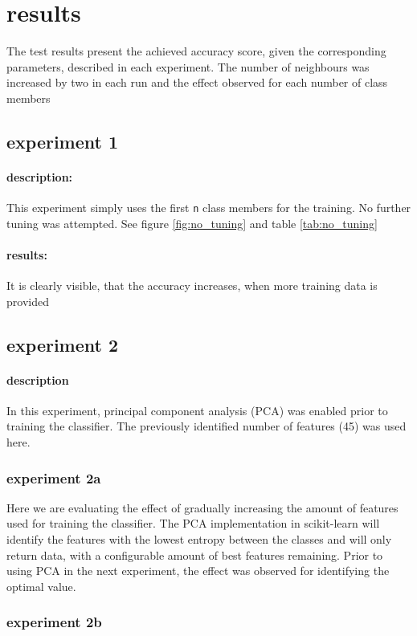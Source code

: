 \documentclass[10pt,a4paper]{proc}
\begin{document}
\section{results}
The test results present the achieved accuracy score, given the corresponding parameters, described in each experiment. The number of neighbours was increased by two in each run and the effect observed for each number of class members
\subsection{experiment 1}\label{exp1}
\paragraph{description:}
This experiment simply uses the first \texttt{n} class members for the training. No further tuning was attempted. See figure \ref{fig:no_tuning} and table \ref{tab:no_tuning}
\paragraph{results:} It is clearly visible, that the accuracy increases, when more training data is provided

\FloatBarrier
\subsection{experiment 2}\label{exp2}
\paragraph{description}
In this experiment, principal component analysis (PCA) was enabled prior to training the classifier. The previously identified number of features (45) was used here.
\subsubsection{experiment 2a}
Here we are evaluating the effect of gradually increasing the amount of features used for training the classifier. The PCA implementation in scikit-learn will identify the features with the lowest entropy between the classes and will only return data, with a configurable amount of best features remaining. Prior to using PCA in the next experiment, the effect was observed for identifying the optimal value. 
\subsubsection{experiment 2b}
\end{document}
